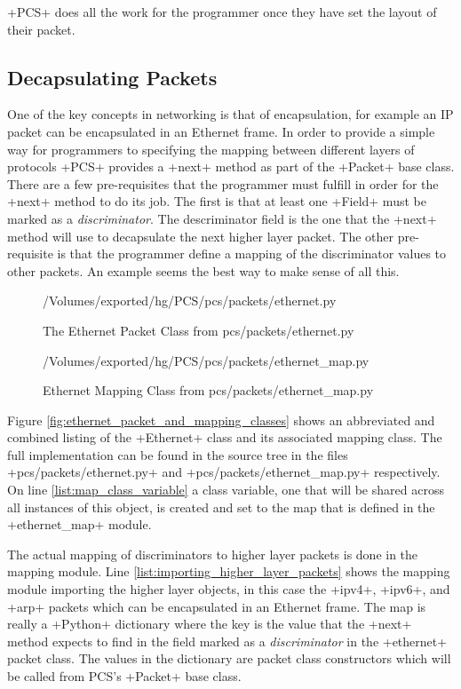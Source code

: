 \documentclass[11pt]{article}
\begin{document}
\program+PCS+ does all the work for the programmer once they have set
the layout of their packet.

\subsection{Decapsulating Packets}
\label{sec:decapsulating_packets}

One of the key concepts in networking is that of encapsulation, for
example an IP packet can be encapsulated in an Ethernet frame.  In
order to provide a simple way for programmers to specifying the
mapping between different layers of protocols \program+PCS+ provides a
\method+next+ method as part of the \class+Packet+ base class. There
are a few pre-requisites that the programmer must fulfill in order for
the \method+next+ method to do its job.  The first is that at least
one \class+Field+ must be marked as a \emph{discriminator}.  The
descriminator field is the one that the \method+next+ method will use
to decapsulate the next higher layer packet.  The other pre-requisite
is that the programmer define a mapping of the discriminator values to
other packets.  An example seems the best way to make sense of all
this.

\begin{figure}
{/Volumes/exported/hg/PCS/pcs/packets/ethernet.py}
  \caption{The Ethernet Packet Class from pcs/packets/ethernet.py}
  \label{fig:ethernet-packet-class}
\end{figure}

\begin{figure}
  {/Volumes/exported/hg/PCS/pcs/packets/ethernet_map.py}
  \caption{Ethernet Mapping Class from pcs/packets/ethernet\_map.py}
  \label{fig:ethernet-mapping-class}
\end{figure}

Figure \ref{fig:ethernet_packet_and_mapping_classes} shows an
abbreviated and combined listing of the \class+Ethernet+ class and its
associated mapping class.  The full implementation can be found in the 
source tree in the files \fullpath+pcs/packets/ethernet.py+ and
\fullpath+pcs/packets/ethernet_map.py+ respectively.  On line
\ref{list:map_class_variable} a class variable, one that will be
shared across all instances of this object, is created and set to the
map that is defined in the \class+ethernet_map+ module.

The actual mapping of discriminators to higher layer packets is done
in the mapping module.  Line \ref{list:importing_higher_layer_packets}
shows the mapping module importing the higher layer objects, in this
case the \class+ipv4+, \class+ipv6+, and \class+arp+ packets which can
be encapsulated in an Ethernet frame.  The map is really a
\program+Python+ dictionary where the key is the value that the
\method+next+ method expects to find in the field marked as a
\emph{discriminator} in the \class+ethernet+ packet class.  The values
in the dictionary are packet class constructors which will be called
from PCS's \class+Packet+ base class.
\end{document}

